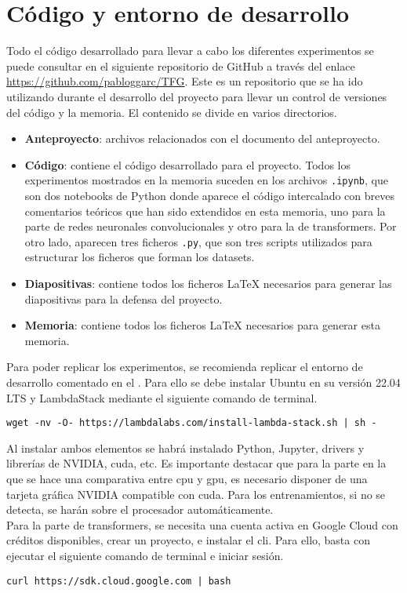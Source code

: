 \chapter{Código y entorno de desarrollo}

	Todo el código desarrollado para llevar a cabo los diferentes experimentos se puede consultar en el siguiente repositorio de GitHub a través del enlace \url{https://github.com/pabloggarc/TFG}. Este es un repositorio que se ha ido utilizando durante el desarrollo del proyecto para llevar un control de versiones del código y la memoria. El contenido se divide en varios directorios. 
	
	\begin{itemize}
		\item \textbf{Anteproyecto}: archivos relacionados con el documento del anteproyecto. 
		\item \textbf{Código}: contiene el código desarrollado para el proyecto. Todos los experimentos mostrados en la memoria suceden en los archivos \texttt{.ipynb}, que son dos notebooks de Python donde aparece el código intercalado con breves comentarios teóricos que han sido extendidos en esta memoria, uno para la parte de redes neuronales convolucionales y otro para la de transformers. Por otro lado, aparecen tres ficheros \texttt{.py}, que son tres scripts utilizados para estructurar los ficheros que forman los datasets. 
		\item \textbf{Diapositivas}: contiene todos los ficheros \LaTeX{} necesarios para generar las diapositivas para la defensa del proyecto. 
		\item \textbf{Memoria}: contiene todos los ficheros \LaTeX{} necesarios para generar esta memoria. 
	\end{itemize}
	
	Para poder replicar los experimentos, se recomienda replicar el entorno de desarrollo comentado en el . Para ello se debe instalar Ubuntu en su versión 22.04 LTS y LambdaStack mediante el siguiente comando de terminal. 
	\begin{center}
		\begin{BVerbatim}[tabsize = 0]
			wget -nv -O- https://lambdalabs.com/install-lambda-stack.sh | sh -
		\end{BVerbatim}
	\end{center}
	Al instalar ambos elementos se habrá instalado Python, Jupyter, drivers y librerías de NVIDIA, \gls{cuda}, etc. Es importante destacar que para la parte en la que se hace una comparativa entre \gls{cpu} y \gls{gpu}, es necesario disponer de una tarjeta gráfica NVIDIA compatible con \gls{cuda}. Para los entrenamientos, si no se detecta, se harán sobre el procesador automáticamente. \\
	
	Para la parte de transformers, se necesita una cuenta activa en Google Cloud con créditos disponibles, crear un proyecto, e instalar el \gls{cli}. Para ello, basta con ejecutar el siguiente comando de terminal e iniciar sesión. 
	\begin{center}
		\begin{BVerbatim}[tabsize = 0]
			curl https://sdk.cloud.google.com | bash
		\end{BVerbatim}
	\end{center}